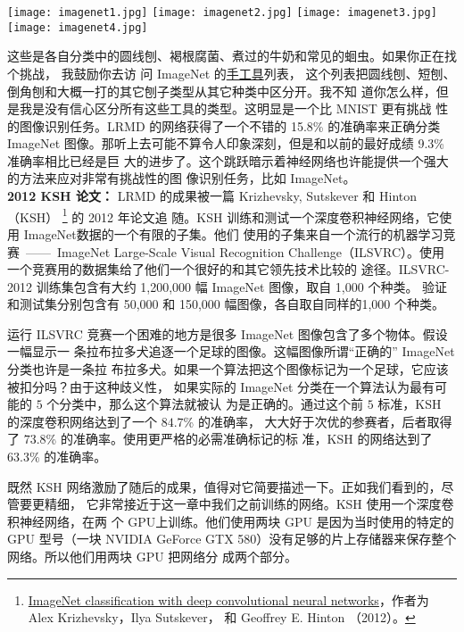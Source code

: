 \begin{center}
  \texttt{[image: imagenet1.jpg]}%
  \texttt{[image: imagenet2.jpg]}%
  \texttt{[image: imagenet3.jpg]}%
  \texttt{[image: imagenet4.jpg]}
\end{center}

这些是各自分类中的圆线刨、褐根腐菌、煮过的牛奶和常见的蛔虫。如果你正在找个挑战，
我鼓励你去访
问 ImageNet 的\href{http://www.image-net.org/synset?wnid=n03489162}{手工具}列表，
这个列表把圆线刨、短刨、倒角刨和大概一打的其它刨子类型从其它种类中区分开。我不知
道你怎么样，但是我是没有信心区分所有这些工具的类型。这明显是一个比 MNIST 更有挑战
性的图像识别任务。LRMD 的网络获得了一个不错的 15.8\% 的准确率来正确分类 ImageNet
图像。那听上去可能不算令人印象深刻，但是和以前的最好成绩 9.3\% 准确率相比已经是巨
大的进步了。这个跳跃暗示着神经网络也许能提供一个强大的方法来应对非常有挑战性的图
像识别任务，比如 ImageNet。\\

\textbf{2012 KSH 论文：} LRMD 的成果被一篇 Krizhevsky,
Sutskever 和 Hinton （KSH）
\footnote{\href{http://www.cs.toronto.edu/~fritz/absps/imagenet.pdf}{ImageNet
    classification with deep convolutional neural networks}，作者为 Alex
  Krizhevsky，Ilya Sutskever， 和 Geoffrey E. Hinton （2012）。} 的 2012 年论文追
随。KSH 训练和测试一个深度卷积神经网络，它使用 ImageNet数据的一个有限的子集。他们
使用的子集来自一个流行的机器学习竞赛~——~ImageNet Large-Scale Visual Recognition
Challenge（ILSVRC）。使用一个竞赛用的数据集给了他们一个很好的和其它领先技术比较的
途径。ILSVRC-2012 训练集包含有大约 1,200,000 幅 ImageNet 图像，取自 1,000 个种类。
验证和测试集分别包含有 50,000 和 150,000 幅图像，各自取自同样的1,000 个种类。

运行 ILSVRC 竞赛一个困难的地方是很多 ImageNet 图像包含了多个物体。假设一幅显示一
条拉布拉多犬追逐一个足球的图像。这幅图像所谓“正确的” ImageNet 分类也许是一条拉
布拉多犬。如果一个算法把这个图像标记为一个足球，它应该被扣分吗？由于这种歧义性，
如果实际的 ImageNet 分类在一个算法认为最有可能的 $5$ 个分类中，那么这个算法就被认
为是正确的。通过这个前 $5$ 标准，KSH 的深度卷积网络达到了一个 $84.7$\% 的准确率，
大大好于次优的参赛者，后者取得了 $73.8$\% 的准确率。使用更严格的必需准确标记的标
准，KSH 的网络达到了 $63.3$\% 的准确率。

既然 KSH 网络激励了随后的成果，值得对它简要描述一下。正如我们看到的，尽管要更精细，
它非常接近于这一章中我们之前训练的网络。KSH 使用一个深度卷积神经网络，在两
个 GPU上训练。他们使用两块 GPU 是因为当时使用的特定的 GPU 型号（一块 NVIDIA
GeForce GTX 580）没有足够的片上存储器来保存整个网络。所以他们用两块 GPU 把网络分
成两个部分。

